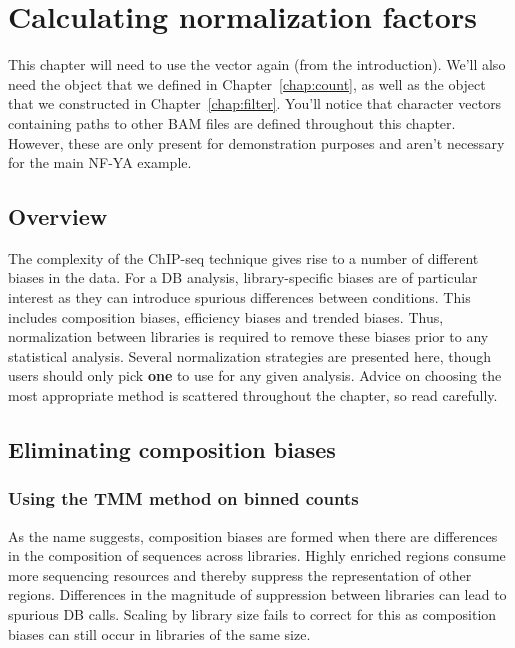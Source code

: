 \documentclass{report}\usepackage[]{graphicx}\usepackage[usenames,dvipsnames]{color}
\newenvironment{combox}
{ \definecolor{shadecolor}{RGB}{255, 240, 240} \begin{shaded}\begin{center}\begin{minipage}[t]{0.95\textwidth} }
{ \end{minipage}\end{center}\end{shaded} \definecolor{shadecolor}{RGB}{240,240,240} }
\begin{document}

\chapter{Calculating normalization factors}
\label{chap:norm}
\begin{combox}
This chapter will need to use the  vector again (from the introduction). 
We'll also need the  object that we defined in Chapter~\ref{chap:count}, as well as the  object that we constructed in Chapter~\ref{chap:filter}.
You'll notice that character vectors containing paths to other BAM files are defined throughout this chapter. 
However, these are only present for demonstration purposes and aren't necessary for the main NF-YA example.
\end{combox}

\section{Overview}
The complexity of the ChIP-seq technique gives rise to a number of different biases in the data.
For a DB analysis, library-specific biases are of particular interest as they can introduce spurious differences between conditions.
This includes composition biases, efficiency biases and trended biases.
Thus, normalization between libraries is required to remove these biases prior to any statistical analysis.
Several normalization strategies are presented here, though users should only pick \textbf{one} to use for any given analysis.
Advice on choosing the most appropriate method is scattered throughout the chapter, so read carefully.

\section{Eliminating composition biases}

\subsection{Using the TMM method on binned counts}
\label{sec:compo_norm}
As the name suggests, composition biases are formed when there are differences in the composition of sequences across libraries. 
Highly enriched regions consume more sequencing resources and thereby suppress the representation of other regions. 
Differences in the magnitude of suppression between libraries can lead to spurious DB calls. 
Scaling by library size fails to correct for this as composition biases can still occur in libraries of the same size. 
\end{document}
